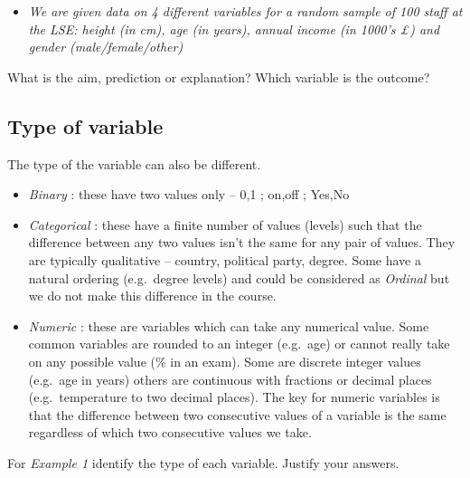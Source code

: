 \documentclass[
]{gitbook}
\providecommand{\tightlist}{%
  \setlength{\itemsep}{0pt}\setlength{\parskip}{0pt}}
\begin{document}
\begin{itemize}
\tightlist
\item
  \emph{We are given data on 4 different variables for a random sample of 100 staff at the LSE: height (in cm), age (in years), annual income (in 1000's £) and gender (male/female/other)}
\end{itemize}

What is the aim, prediction or explanation? Which variable is the outcome?


\hypertarget{type-of-variable}{%
\subsection{Type of variable}\label{type-of-variable}}

The type of the variable can also be different.

\begin{itemize}
\tightlist
\item
  \emph{Binary} : these have two values only -- 0,1 ; on,off ; Yes,No
\item
  \emph{Categorical} : these have a finite number of values (levels) such that the difference between any two values isn't the same for any pair of values. They are typically qualitative -- country, political party, degree. Some have a natural ordering (e.g.~degree levels) and could be considered as \emph{Ordinal} but we do not make this difference in the course.
\item
  \emph{Numeric} : these are variables which can take any numerical value. Some common variables are rounded to an integer (e.g.~age) or cannot really take on any possible value (\% in an exam). Some are discrete integer values (e.g.~age in years) others are continuous with fractions or decimal places (e.g.~temperature to two decimal places). The key for numeric variables is that the difference between two consecutive values of a variable is the same regardless of which two consecutive values we take.
\end{itemize}

For \emph{Example 1} identify the type of each variable. Justify your answers.
\end{document}
